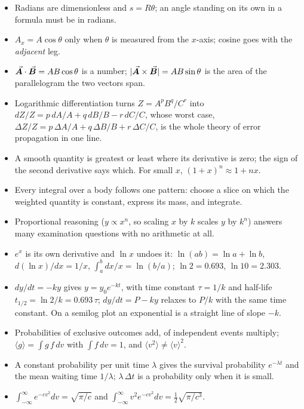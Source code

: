 \begin{itemize}
\item Radians are dimensionless and $s=R\theta$; an angle standing on its own in a formula must be in
      radians.
\item $A_x=A\cos\theta$ only when $\theta$ is measured from the $x$-axis; cosine goes with the
      \emph{adjacent} leg.
\item $\vec{\bm{A}}\cdot\vec{\bm{B}}=AB\cos\theta$ is a number; $|\vec{\bm{A}}\times\vec{\bm{B}}|=AB\sin\theta$ is the area of the
      parallelogram the two vectors span.
\item Logarithmic differentiation turns $Z=A^pB^q/C^r$ into $dZ/Z=p\,dA/A+q\,dB/B-r\,dC/C$, whose
      worst case, $\Delta Z/Z=p\,\Delta A/A+q\,\Delta B/B+r\,\Delta C/C$, is the whole theory of error
      propagation in one line.
\item A smooth quantity is greatest or least where its derivative is zero; the sign of the second
      derivative says which. For small $x$, $(1+x)^n\approx1+nx$.
\item Every integral over a body follows one pattern: choose a slice on which the weighted quantity is
      constant, express its mass, and integrate.
\item Proportional reasoning ($y\propto x^n$, so scaling $x$ by $k$ scales $y$ by $k^n$) answers many
      examination questions with no arithmetic at all.
\item $e^{x}$ is its own derivative and $\ln x$ undoes it: $\ln(ab)=\ln a+\ln b$, $d(\ln x)/dx=1/x$,
      $\int_a^b dx/x=\ln(b/a)$; $\ln2=0.693$, $\ln10=2.303$.
\item $dy/dt=-ky$ gives $y=y_0e^{-kt}$, with time constant $\tau=1/k$ and half-life
      $t_{1/2}=\ln2/k=0.693\,\tau$; $dy/dt=P-ky$ relaxes to $P/k$ with the same time constant. On a
      semilog plot an exponential is a straight line of slope $-k$.
\item Probabilities of exclusive outcomes add, of independent events multiply;
      $\langle g\rangle=\int g\,f\,dv$ with $\int f\,dv=1$, and $\langle v^2\rangle\ne\langle v\rangle^2$.
\item A constant probability per unit time $\lambda$ gives the survival probability $e^{-\lambda t}$ and
      the mean waiting time $1/\lambda$; $\lambda\,\Delta t$ is a probability only when it is small.
\item $\int_{-\infty}^{\infty}e^{-cv^2}dv=\sqrt{\pi/c}$ and
      $\int_{-\infty}^{\infty}v^2e^{-cv^2}dv=\tfrac12\sqrt{\pi/c^3}$.
\end{itemize}

